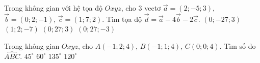 \begin{ex}%
	Trong không gian với hệ tọa độ $Oxyz$, cho $3$ vectơ $\vec{a}=\left(2;-5;3\right)$, $\vec{b}=\left(0;2;-1\right)$, $\vec{c}=\left(1;7;2\right)$. Tìm tọa độ $\vec{d}=\vec{a}-4\vec{b}-2\vec{c}$.
	\choice
	{\True $\left(0;-27;3\right)$}
	{$\left(1;2;-7\right)$}
	{$\left(0;27;3\right)$}
	{$\left(0;27;-3\right)$}
\end{ex}

\begin{ex}%
	Trong không gian $Oxyz$, cho $A(-1;2;4)$, $B(-1;1;4)$, $C(0;0;4)$. Tìm số đo $\widehat{ABC}$.
	\choice
	{$45^\circ $}
	{$60^\circ $}
	{\True $135^\circ $}
	{$120^\circ $}
\end{ex}

